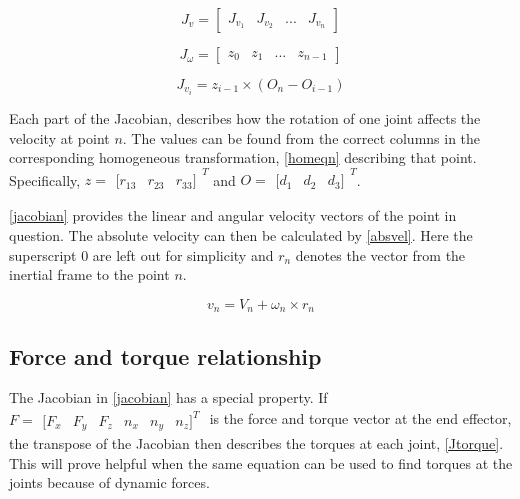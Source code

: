 \begin{equation}\label{Jvel}
J_v = \begin{bmatrix}
J_{v_1} & J_{v_2} & ... & J_{v_n}
\end{bmatrix}
\end{equation}

\begin{equation}\label{Jomega}
J_{\omega} = \begin{bmatrix}
z_0 & z_1 & ... & z_{n-1}
\end{bmatrix}
\end{equation}

\begin{equation}\label{Jvi}
J_{v_i} = z_{i-1}\times (O_n - O_{i-1})
\end{equation}

Each part of the Jacobian,  describes how the rotation of one joint affects the velocity at point $n$. The values can be found from the correct columns in the corresponding homogeneous transformation, \eqref{homeqn} describing that point. Specifically, $z=\begin{matrix}[
r_{13} & r_{23} & r_{33}]
\end{matrix}^T$ and $O=\begin{matrix}[
d_{1} & d_{2} & d_{3}]
\end{matrix}^T$.

\eqref{jacobian} provides the linear and angular velocity vectors of the point in question. The absolute velocity can then be calculated by \eqref{absvel}. Here the superscript $0$ are left out for simplicity and $r_n$ denotes the vector from the inertial frame to the point $n$.

\begin{equation}\label{absvel}
v_{n}=V_n+\omega_n\times r_n
\end{equation}

\subsection{Force and torque relationship}

The Jacobian in \eqref{jacobian} has a special property. If \\$F = \begin{matrix}[
F_{x} & F_{y} & F_{z} & n_x & n_y & n_z]^T
\end{matrix}$ is the force and torque vector at the end effector, the transpose of the Jacobian then describes the torques at each joint, \eqref{Jtorque}. This will prove helpful when the same equation can be used to find torques at the joints because of dynamic forces.

